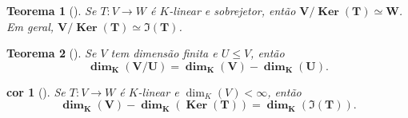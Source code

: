 \documentclass[11pt]{article}
\DeclareMathOperator{\Ker}{Ker}   %
\newcommand{\defname}[1]{\colorbox{yellow!30}{\strut \textbf{#1}}}
\newtheorem*{theorem}{Teorema}
\newtheorem*{corollary}{cor}
\theoremstyle{definition}
\begin{document}
\begin{multicols}{3}
\begin{theorem}[\defname{Isomorfismo}]
Se $T:V\to W$ é $K$-linear e sobrejetor, então \(\mathbf{V/\Ker(T)\simeq W}\). Em geral,
\(\mathbf{V/\Ker(T)\simeq \Im(T)}\).
\end{theorem}

\begin{theorem}[\defname{Dimensão para Quocientes}]
Se $V$ tem dimensão finita e $U\le V$, então
\[
\mathbf{\dim_K(V/U)=\dim_K(V)-\dim_K(U)}.
\]
\end{theorem}

\begin{corollary}[\defname{Teorema do Núcleo e da Imagem}]
Se $T:V\to W$ é $K$-linear e \(\dim_K(V)<\infty\), então
\[
\mathbf{\dim_K(V)-\dim_K(\Ker(T))=\dim_K(\Im(T))}.
\]
\end{corollary}
\end{multicols}
\end{document}

